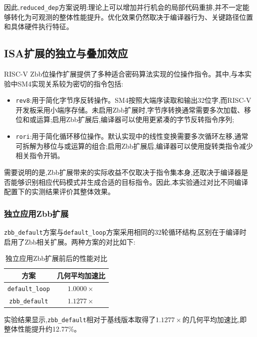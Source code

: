 因此,\texttt{reduced\_dep}方案说明:理论上可以增加并行机会的局部代码重排,并不一定能够转化为可观测的整体性能提升。优化效果仍然取决于编译器行为、关键路径位置和具体硬件执行特征。



\subsection{ISA扩展的独立与叠加效应}

RISC-V Zbb位操作扩展提供了多种适合密码算法实现的位操作指令。其中,与本实验中SM4实现关系较为密切的指令包括:

\begin{itemize}
    \item \texttt{rev8}:用于简化字节序反转操作。SM4按照大端序读取和输出32位字,而RISC-V开发板采用小端序存储。未启用Zbb扩展时,字节序转换通常需要多次加载、移位和或运算;启用Zbb扩展后,编译器可以使用更紧凑的字节反转指令序列;
    \item \texttt{rori}:用于简化循环移位操作。默认实现中的线性变换需要多次循环左移,通常可拆解为移位与或运算的组合;启用Zbb扩展后,编译器可以使用旋转类指令减少相关指令开销。
\end{itemize}

需要说明的是,Zbb扩展带来的实际收益不仅取决于指令集本身,还取决于编译器是否能够识别相应代码模式并生成合适的目标指令。因此,本实验通过对比不同编译配置下的实测结果评价其整体效果。

\subsubsection{独立应用Zbb扩展}

\texttt{zbb\_default}方案与\texttt{default\_loop}方案采用相同的32轮循环结构,区别在于编译时启用了Zbb相关扩展。两种方案的对比如下:

\begin{table}[H]
    \centering
    \caption{独立应用Zbb扩展前后的性能对比}
    \label{tab:zbb-independent}
    \begin{tabular}{c|c}
        \toprule
        方案 & 几何平均加速比 \\
        \midrule
        \texttt{default\_loop} & $1.0000\times$ \\
        \texttt{zbb\_default} & $1.1277\times$ \\
        \bottomrule
    \end{tabular}
\end{table}

实验结果显示,\texttt{zbb\_default}相对于基线版本取得了$1.1277\times$的几何平均加速比,即整体性能提升约12.77\%。

